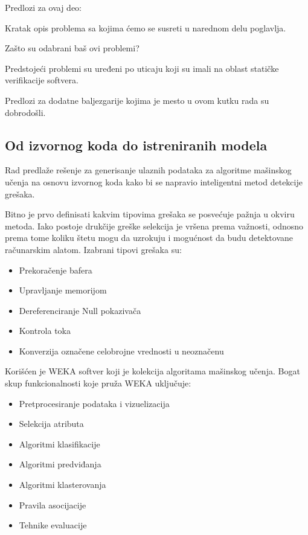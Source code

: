\documentclass[a4paper]{article}
\begin{document}
Predlozi za ovaj deo:

Kratak opis problema sa kojima ćemo se susreti u narednom delu poglavlja. 

Zašto su odabrani baš ovi problemi?

Predstojeći problemi su uređeni po uticaju koji su imali na oblast statičke verifikacije softvera.

Predlozi za dodatne baljezgarije kojima je mesto u ovom kutku rada su dobrodošli.


\subsection{Od izvornog koda do istreniranih modela}
\label{subsec:pregled}

Rad \cite{staticFeatures} predlaže rešenje za generisanje ulaznih podataka za algoritme mašinskog učenja na osnovu
izvornog koda kako bi se napravio inteligentni metod detekcije grešaka.

Bitno je prvo definisati kakvim tipovima grešaka se posvećuje pažnja u okviru metoda.
Iako postoje drukčije greške selekcija je vršena prema važnosti, odnosno prema tome
koliku štetu mogu da uzrokuju i mogućnost da budu detektovane računarskim alatom. Izabrani tipovi grešaka su:

\begin{itemize}
\item Prekoračenje bafera

\item Upravljanje memorijom

\item Dereferenciranje Null pokazivača

\item Kontrola toka

\item Konverzija označene celobrojne vrednosti u neoznačenu
\end{itemize}


Korišćen je WEKA softver koji je kolekcija algoritama mašinskog učenja.
Bogat skup funkcionalnosti koje pruža WEKA uključuje:
\begin{itemize}
\item Pretprocesiranje podataka i vizuelizacija
\item Selekcija atributa
\item Algoritmi klasifikacije
\item Algoritmi predviđanja
\item Algoritmi klasterovanja
\item Pravila asocijacije
\item Tehnike evaluacije
\end{itemize}
\end{document}
